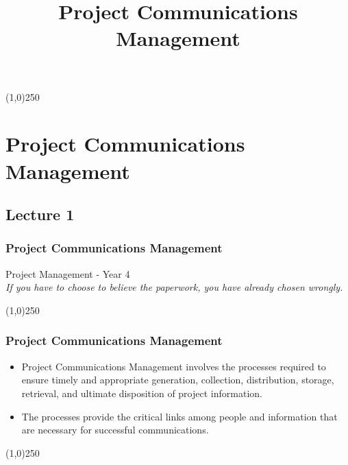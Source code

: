 




\title[Project Management \& BIM]{Project Communications Management}




%
\usetikzlibrary{arrows}

\tableofcontents
\newpage



\begin{frame}
\titlepage
\end{frame}\begin{center}\line(1,0){250}\end{center}
%
%


\section{Project Communications Management}

\subsection{Lecture 1}





\begin{frame}
\frametitle{Project Communications Management}
Project Management - Year 4\\
\textit{If you have to choose to believe the paperwork, you have already chosen wrongly.}\\
\end{frame}\begin{center}\line(1,0){250}\end{center}


\begin{frame}
\frametitle{Project Communications Management}
\begin{itemize}
	\item Project Communications Management involves the processes required to ensure timely and appropriate generation, collection, distribution, storage, retrieval, and ultimate disposition of project information.
	\item The processes provide the critical links among people and information that are necessary for successful communications.
\end{itemize}
\end{frame}\begin{center}\line(1,0){250}\end{center}


